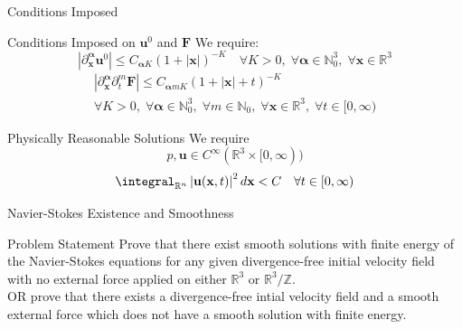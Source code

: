\documentclass{beamer}
\newcommand{\Real}{\mathbb{R}}
\newcommand{\Integer}{\mathbb{Z}}
\newcommand{\Natural}{\mathbb{N}}
\begin{document}
  \begin{frame}{Conditions Imposed}
      \linespread{0.8}
      \pause
      \begin{block}{Conditions Imposed on $\mathbf{u}^0$ and $\mathbf{F}$}
          We require:
          $$
          \left| \partial^{\boldsymbol{\alpha}}_{\mathbf{x}} \mathbf{u}^0
          \right| \le
          C_{\boldsymbol{\alpha}K} \left(1 + \left|\mathbf{x}\right|\right)^{-K} \quad
          \forall K > 0, \; \forall \boldsymbol{\alpha} \in \Natural_0^3, \;
          \forall \mathbf{x} \in \Real^3
          $$\pause
          \begin{multline*}
          \left| \partial^{\boldsymbol{\alpha}}_{\mathbf{x}}
          \partial^m_t \mathbf{F}
          \right| \le
          C_{\boldsymbol{\alpha}mK} \left(1 + \left|\mathbf{x}\right| +
          t\right)^{-K} \\
          \forall K > 0, \; \forall \boldsymbol{\alpha} \in \Natural_0^3, \;
          \forall m \in \Natural_0, \; \forall \mathbf{x} \in \Real^3, \;
          \forall t \in [0, \infty)
          \end{multline*}
      \end{block}
      \pause
      \begin{block}{Physically Reasonable Solutions}
          We require
          $$
          p, \mathbf{u} \in C^{\infty}(\Real^3 \times [0, \infty))
          $$
          \pause
          $$
          \integral_{\Real^n} \left| \mathbf{u}(\mathbf{x}, t) \right|^2
          d\mathbf{x} < C \quad \forall t \in [0, \infty)
          $$
      \end{block}
  \end{frame}
  \begin{frame}{Navier-Stokes Existence and Smoothness}
      \begin{block}{Problem Statement}
          Prove that there exist smooth solutions with finite energy of the
          Navier-Stokes equations for any given divergence-free initial
          velocity field with no external force applied on either $\Real^3$
          or $\Real^3/\Integer$.\pause\\
          OR prove that there exists a divergence-free
          intial velocity field and a smooth external force which does not
          have a smooth solution with finite energy.
      \end{block}
  \end{frame}
\end{document}
